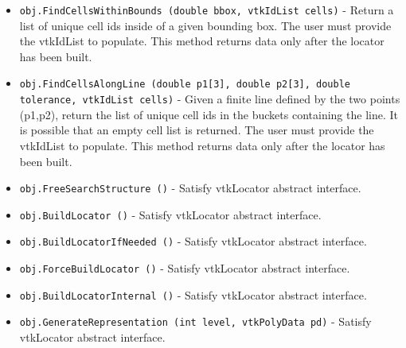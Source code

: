 \begin{itemize}
\item  \verb|obj.FindCellsWithinBounds (double bbox, vtkIdList cells)| -  Return a list of unique cell ids inside of a given bounding box. The
 user must provide the vtkIdList to populate. This method returns data
 only after the locator has been built.

\item  \verb|obj.FindCellsAlongLine (double p1[3], double p2[3], double tolerance, vtkIdList cells)| -  Given a finite line defined by the two points (p1,p2), return the list
 of unique cell ids in the buckets containing the line. It is possible
 that an empty cell list is returned. The user must provide the vtkIdList
 to populate. This method returns data only after the locator has been
 built.

\item  \verb|obj.FreeSearchStructure ()| -  Satisfy vtkLocator abstract interface.

\item  \verb|obj.BuildLocator ()| -  Satisfy vtkLocator abstract interface.

\item  \verb|obj.BuildLocatorIfNeeded ()| -  Satisfy vtkLocator abstract interface.

\item  \verb|obj.ForceBuildLocator ()| -  Satisfy vtkLocator abstract interface.

\item  \verb|obj.BuildLocatorInternal ()| -  Satisfy vtkLocator abstract interface.

\item  \verb|obj.GenerateRepresentation (int level, vtkPolyData pd)| -  Satisfy vtkLocator abstract interface.

\end{itemize}
